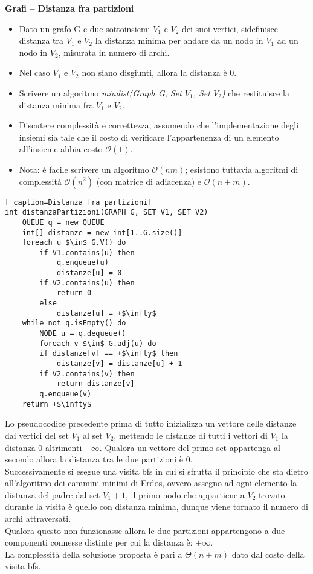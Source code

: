 \documentclass[../cheatSheetAlgoritmi.tex]{subfiles}
\begin{document}
\bigskip
\textbf{Grafi – Distanza fra partizioni}

\begin{itemize}
	\item Dato un grafo G e due sottoinsiemi $V_1$ e $V_2$ dei suoi vertici, sidefinisce distanza tra $V_1$ e $V_2$ la distanza minima per andare da un nodo in $V_1$ ad un nodo in $V_2$, misurata in numero di archi.
	\item Nel caso $V_1$ e $V_2$ non siano disgiunti, allora la distanza è 0.
	\item Scrivere un algoritmo \textit{mindist(Graph G, Set $V_1$, Set $V_2$)} che restituisce la distanza minima fra $V_1$ e $V_2$.
	\item Discutere complessità e correttezza, assumendo che l'implementazione degli insiemi sia tale che il costo di verificare l'appartenenza di un elemento all’insieme abbia costo $\mathcal{O}(1)$.
	\item Nota: è facile scrivere un algoritmo $\mathcal{O}(nm)$; esistono tuttavia algoritmi di complessità $\mathcal{O}(n^2)$ (con matrice di adiacenza) e $\mathcal{O}(n + m)$.
\end{itemize}

\newpage
\begin{lstlisting}[ caption=Distanza fra partizioni]
int distanzaPartizioni(GRAPH G, SET V1, SET V2)
	QUEUE q = new QUEUE
  	int[] distanze = new int[1..G.size()]
  	foreach u $\in$ G.V() do
    	if V1.contains(u) then
      		q.enqueue(u)
      		distanze[u] = 0
      	if V2.contains(u) then
        	return 0
    	else
      		distanze[u] = +$\infty$
 	while not q.isEmpty() do
    	NODE u = q.dequeue()
    	foreach v $\in$ G.adj(u) do
    	if distanze[v] == +$\infty$ then
      		distanze[v] = distanze[u] + 1
      	if V2.contains(v) then
        	return distanze[v]
      	q.enqueue(v)
  	return +$\infty$
\end{lstlisting}
Lo pseudocodice precedente prima di tutto inizializza un vettore delle distanze dai vertici del set $V_1$ al set $V_2$, mettendo le distanze di tutti i vettori di $V_1$ la distanza 0 altrimenti $+\infty$. Qualora un vettore del primo set appartenga al secondo allora la distanza tra le due partizioni è 0. \\
Successivamente si esegue una visita bfs in cui si sfrutta il principio che sta dietro all'algoritmo dei cammini minimi di Erdos, ovvero assegno ad ogni elemento la distanza del padre dal set $V_1 + 1$, il primo nodo che appartiene a $V_2$ trovato durante la visita è quello con distanza minima, dunque viene tornato il numero di archi attraversati. \\
Qualora questo non funzionasse allora le due partizioni appartengono a due componenti connesse distinte per cui la distanza è: $+\infty$. \\
La complessità della soluzione proposta è pari a $\Theta(n + m)$ dato dal costo della visita bfs.
\end{document}
